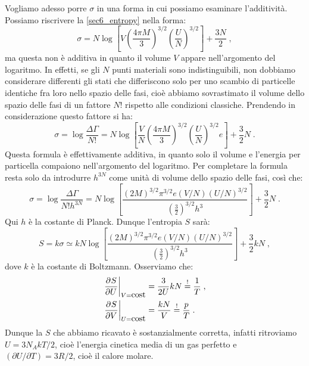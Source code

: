 Vogliamo adesso porre $\sigma$ in una forma in cui possiamo esaminare l'additività. Possiamo riscrivere la \eqref{sec6_entropy} nella forma:
\begin{equation}
\sigma=N\log\left[V\left(\frac{4\pi M}{3}\right)^{3/2}\left(\frac{U}{N}\right)^{3/2}\right]+\frac{3N}{2}\;,
\end{equation}
ma questa non è additiva in quanto il volume $V$ appare nell'argomento del logaritmo. In effetti, se gli $N$ punti materiali sono indistinguibili, non dobbiamo considerare differenti gli stati che differiscono solo per uno scambio di particelle identiche fra loro nello spazio delle fasi, cioè abbiamo sovrastimato il volume dello spazio delle fasi di un fattore $N!$ rispetto alle condizioni classiche. Prendendo in considerazione questo fattore si ha:
\begin{equation}
\sigma=\log\frac{\Delta\Gamma}{N!}=N\log\left[\frac{V}{N}\left(\frac{4\pi M}{3}\right)^{3/2}\left(\frac{U}{N}\right)^{3/2}e\right]+\frac{3}{2}N\;.
\end{equation}
Questa formula è effettivamente additiva, in quanto solo il volume e l'energia per particella compaiono nell'argomento del logaritmo. Per completare la formula resta solo da introdurre $h^{3N}$ come unità di volume dello spazio delle fasi, così che:
\begin{equation}
\sigma=\log\frac{\Delta\Gamma}{N!h^{3N}}=N\log\left[\frac{(2M)^{3/2}\pi^{3/2}e(V/N)(U/N)^{3/2}}{(\frac{3}{2})^{3/2}h^3}\right]+\frac{3}{2}N\;.
\end{equation}
Qui $h$ è la costante di Planck. Dunque l'entropia $S$ sarà:
\begin{equation}
S=k\sigma \simeq kN\log\left[\frac{(2M)^{3/2}\pi^{3/2}e(V/N)(U/N)^{3/2}}{(\frac{3}{2})^{3/2}h^3}\right]+\frac{3}{2}kN\;,
\end{equation}
dove $k$ è la costante di Boltzmann. Osserviamo che:
\begin{align}
\left.\frac{\partial^{}S}{\partial U^{}}\right|_{V=\mbox{cost}} &=\frac{3}{2U}kN\stackrel{!}{=}\frac{1}{T}\;, \\
\left.\frac{\partial^{}S}{\partial V^{}}\right|_{U=\mbox{cost}} &= \frac{kN}{V}\stackrel{!}{=}\frac{p}{T}\;.
\end{align}
Dunque la $S$ che abbiamo ricavato è sostanzialmente corretta, infatti ritroviamo $U=3N_AkT/2$, cioè l'energia cinetica media di un gas perfetto e $(\partial U/\partial T)=3R/2$, cioè il calore molare.
\pagebreak
